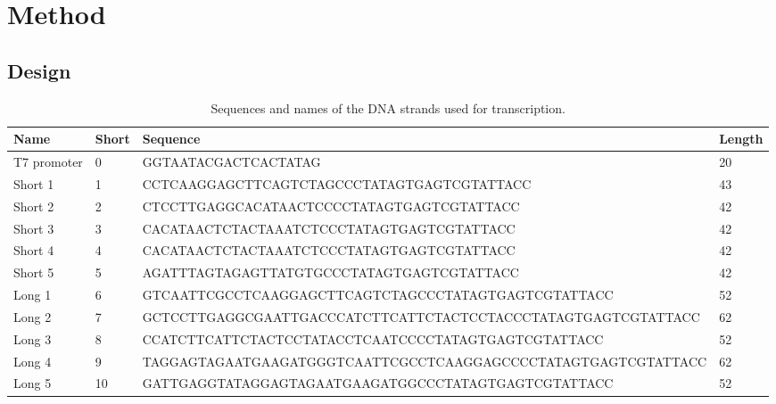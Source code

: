 \section{Method}

\subsection{Design}

\begin{table}
\begin{adjustbox}{width=\columnwidth}
\small
\begin{tabular}{llll}
\hline
\textbf{Name}      & \textbf{Short} & \textbf{Sequence}                                           & \textbf{Length} \\
\hline
T7 promoter        & 0          & GGTAATACGACTCACTATAG                                           & 20     \\
Short 1            & 1          & CCTCAAGGAGCTTCAGTCTAGCCCTATAGTGAGTCGTATTACC                    & 43     \\
Short 2            & 2          & CTCCTTGAGGCACATAACTCCCCTATAGTGAGTCGTATTACC                     & 42     \\
Short 3            & 3          & CACATAACTCTACTAAATCTCCCTATAGTGAGTCGTATTACC                     & 42     \\
Short 4            & 4          & CACATAACTCTACTAAATCTCCCTATAGTGAGTCGTATTACC                     & 42     \\
Short 5            & 5          & AGATTTAGTAGAGTTATGTGCCCTATAGTGAGTCGTATTACC                     & 42     \\
Long 1             & 6          & GTCAATTCGCCTCAAGGAGCTTCAGTCTAGCCCTATAGTGAGTCGTATTACC           & 52     \\
Long 2             & 7          & GCTCCTTGAGGCGAATTGACCCATCTTCATTCTACTCCTACCCTATAGTGAGTCGTATTACC & 62     \\
Long 3             & 8          & CCATCTTCATTCTACTCCTATACCTCAATCCCCTATAGTGAGTCGTATTACC           & 52     \\
Long 4             & 9          & TAGGAGTAGAATGAAGATGGGTCAATTCGCCTCAAGGAGCCCCTATAGTGAGTCGTATTACC & 62     \\
Long 5             & 10         & GATTGAGGTATAGGAGTAGAATGAAGATGGCCCTATAGTGAGTCGTATTACC           & 52     \\
\hline
\end{tabular}
\end{adjustbox}
\caption{Sequences and names of the DNA strands used for transcription.}
\end{table}

